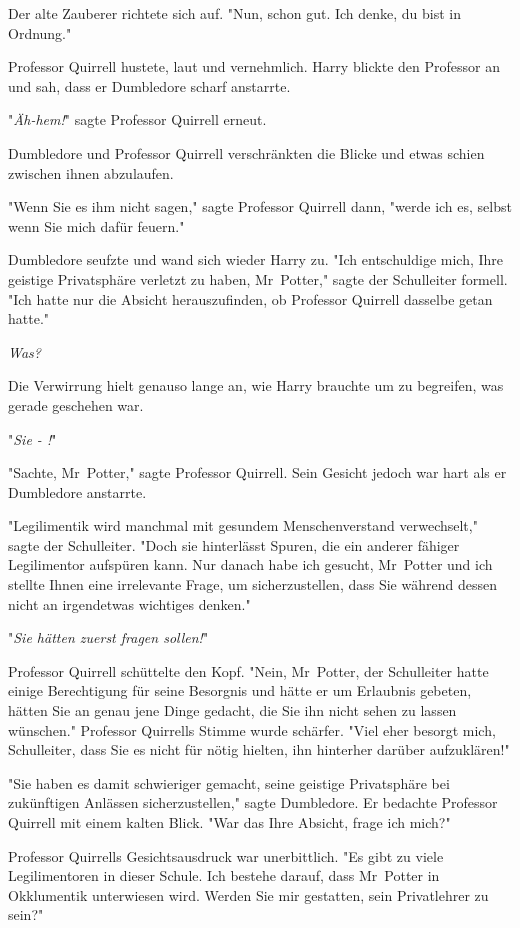 {Der alte Zauberer richtete sich auf. "Nun, schon gut. Ich denke, du bist in Ordnung."

Professor Quirrell hustete, laut und vernehmlich. Harry blickte den Professor an und sah, dass er Dumbledore scharf anstarrte.

"\emph{Äh-hem!}" sagte Professor Quirrell erneut.

Dumbledore und Professor Quirrell verschränkten die Blicke und etwas schien zwischen ihnen abzulaufen.

"Wenn Sie es ihm nicht sagen," sagte Professor Quirrell dann, "werde ich es, selbst wenn Sie mich dafür feuern."

Dumbledore seufzte und wand sich wieder Harry zu. "Ich entschuldige mich, Ihre geistige Privatsphäre verletzt zu haben, Mr~Potter," sagte der Schulleiter formell. "Ich hatte nur die Absicht herauszufinden, ob Professor Quirrell dasselbe getan hatte."

\emph{Was?}

Die Verwirrung hielt genauso lange an, wie Harry brauchte um zu begreifen, was gerade geschehen war.

"\emph{Sie - !}"

"Sachte, Mr~Potter," sagte Professor Quirrell. Sein Gesicht jedoch war hart als er Dumbledore anstarrte.

"Legilimentik wird manchmal mit gesundem Menschenverstand verwechselt," sagte der Schulleiter. "Doch sie hinterlässt Spuren, die ein anderer fähiger Legilimentor aufspüren kann. Nur danach habe ich gesucht, Mr~Potter und ich stellte Ihnen eine irrelevante Frage, um sicherzustellen, dass Sie während dessen nicht an irgendetwas wichtiges denken."

"\emph{Sie hätten zuerst fragen sollen!}"

Professor Quirrell schüttelte den Kopf. "Nein, Mr~Potter, der Schulleiter hatte einige Berechtigung für seine Besorgnis und hätte er um Erlaubnis gebeten, hätten Sie an genau jene Dinge gedacht, die Sie ihn nicht sehen zu lassen wünschen." Professor Quirrells Stimme wurde schärfer. "Viel eher besorgt mich, Schulleiter, dass Sie es nicht für nötig hielten, ihn hinterher darüber aufzuklären!"

"Sie haben es damit schwieriger gemacht, seine geistige Privatsphäre bei zukünftigen Anlässen sicherzustellen," sagte Dumbledore. Er bedachte Professor Quirrell mit einem kalten Blick. "War das Ihre Absicht, frage ich mich?"

Professor Quirrells Gesichtsausdruck war unerbittlich. "Es gibt zu viele Legilimentoren in dieser Schule. Ich bestehe darauf, dass Mr~Potter in Okklumentik unterwiesen wird. Werden Sie mir gestatten, sein Privatlehrer zu sein?"

}
